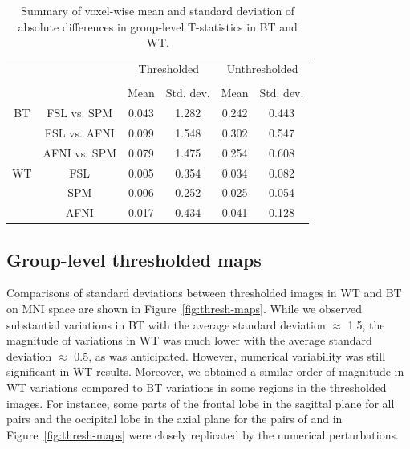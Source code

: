 \documentclass[conference]{IEEEtran}
\begin{document}
\setlength{\tabcolsep}{7pt}
\begin{table}[h]
    \centering
    \begin{tabular}{cccc|cc}
        \toprule
        \multirow{2}{*}{}& {} & \multicolumn{2}{c}{Thresholded} & \multicolumn{2}{c}{Unthresholded} \\
        \cmidrule{3-4} \cmidrule{5-6} \\
        {} & {} & Mean & Std. dev. & Mean & Std. dev. \\
        \midrule
        \rowcolor{lightgray}
        {BT} & FSL vs. SPM        &  0.043       & 1.282      & 0.242     & 0.443  \\
        \rowcolor{lightgray}
        {} & FSL vs. AFNI         &  0.099       & 1.548      & 0.302     & 0.547  \\
        \rowcolor{lightgray}
        {} & AFNI vs. SPM         &  0.079       & 1.475      & 0.254     & 0.608  \\
        {WT} & FSL    &  0.005       & 0.354      & 0.034     & 0.082  \\
        {}   & SPM    &  0.006       & 0.252      & 0.025     & 0.054  \\
        {}   & AFNI   &  0.017       & 0.434      & 0.041     & 0.128  \\
        \bottomrule
    \end{tabular}
    \caption{Summary of voxel-wise mean and standard deviation of absolute differences in group-level T-statistics in BT and WT.}
    \label{table:pipeline-stats}
\end{table}


\subsection{Group-level thresholded maps}

Comparisons of standard deviations between thresholded images in WT and BT
on MNI space are shown in Figure~\ref{fig:thresh-maps}.
While we observed substantial variations in BT with the average standard deviation $\approx$ 1.5,
the magnitude of variations in WT was much lower with the average standard deviation $\approx$ 0.5,
as was anticipated. However, numerical variability was still significant in WT results.
Moreover, we obtained a similar order of magnitude in WT variations compared to BT variations
in some regions in the thresholded images.
For instance, some parts of the frontal lobe in the sagittal plane for all pairs and the occipital
lobe in the axial plane for the pairs of \fslspm and \fslafni in Figure~\ref{fig:thresh-maps}
were closely replicated by the numerical perturbations.
\end{document}
